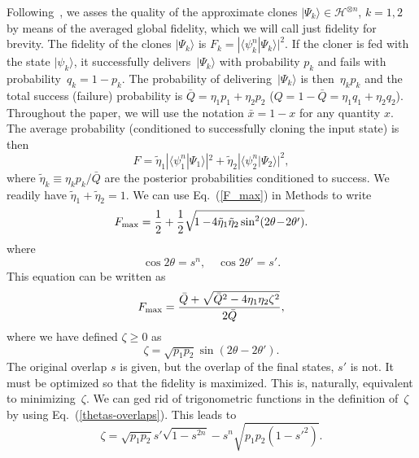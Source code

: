 \documentclass[aps,pra,twocolumn,showpacs]{revtex4-1}
\begin{document}
Following~\cite{Chefles+Barnett inter}, we asses the quality of the approximate clones  $|\Psi_k\rangle\in{\mathscr H}^{\otimes n}$, $k=1,2$ by means of the averaged global fidelity, which we will call just fidelity for brevity. The fidelity of the clones $|\Psi_k\rangle$ is $F_k=|\langle\psi_k^n|\Psi_k\rangle|^2$. If the cloner is fed with the state $|\psi_k\rangle$, it successfully delivers~$|\Psi_k\rangle$ with probability $p_k$ and fails with probability~$q_k=1-p_k$. The probability of delivering~$|\Psi_k\rangle$ is then~$\eta_k p_k$ and the total success (failure) probability is $\bar Q=\eta_1p_1+\eta_2p_2$ ($Q=1-\bar Q=\eta_1q_1+\eta_2q_2$). Throughout the paper, we will use the notation $\bar x=1-x$ for any quantity $x$. The average probability (conditioned to successfully cloning the input state) is then %
%
\begin{equation}
F=\tilde\eta_1|\langle \psi^n_1|\Psi_1\rangle|^2 +\tilde\eta_2|\langle \psi^n_2|\Psi_2\rangle|^2,
\end{equation}
%
where $\tilde\eta_k\equiv \eta_kp_k/\bar Q$ are the posterior probabilities conditioned to success. We readily have $\tilde\eta_1+\tilde\eta_2=1$. We can use Eq.~(\ref{F_max}) in Methods to write
%
\begin{equation}
F_{\rm max}={1\over2}+{1\over2}
\sqrt{\!1-\!4\tilde\eta_1\tilde\eta_2\sin^2(2\theta\!-\!2\theta')} .
\end{equation}
%
where
%
\begin{equation}
\cos2\theta=s^n,\quad \cos2\theta'=s' .
\label{thetas-overlaps}
\end{equation}
%
This equation can be written as
%
\begin{equation}
F_{\rm max}={\bar Q+\sqrt{\bar Q^2-4\eta_1\eta_2\zeta^2}\over2\bar Q} ,
\label{Fmax}
\end{equation}
%
where we have defined $\zeta\ge0$ as
%
\begin{equation}
\zeta=\sqrt{p_1p_2}\sin(2\theta-2\theta').
\end{equation}
%
The original overlap $s$ is given, but the overlap of the final states, $s'$ is not. It must be optimized so that the fidelity is maximized. This is, naturally, equivalent to minimizing~$\zeta$.
We can ged rid of trigonometric functions in the definition of~$\zeta$ by using Eq.~(\ref{thetas-overlaps}). This leads to
%
\begin{equation}
\zeta=\sqrt{p_1p_2}s'\sqrt{1\!-\!s^{2n}}\!-\!s^n\sqrt{p_1p_2(1\!-\!s'^2)} .
\label{zeta notrig}
\end{equation}
\end{document}
